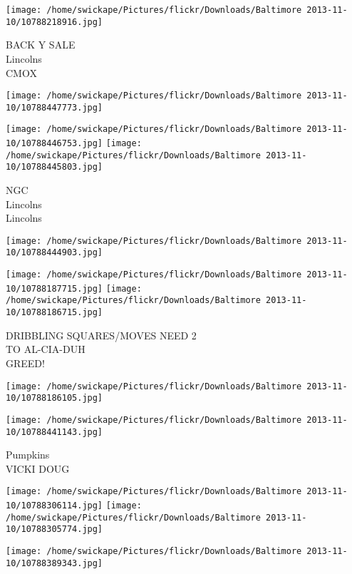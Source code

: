 \documentclass[10pt,letterpaper]{article}
\begin{document}
\texttt{[image: /home/swickape/Pictures/flickr/Downloads/Baltimore 2013-11-10/10788218916.jpg]}

BACK Y SALE\\
Lincolns\\
CMOX\\
\pagebreak

\texttt{[image: /home/swickape/Pictures/flickr/Downloads/Baltimore 2013-11-10/10788447773.jpg]}

\vspace{0.25in}
\texttt{[image: /home/swickape/Pictures/flickr/Downloads/Baltimore 2013-11-10/10788446753.jpg]}
\texttt{[image: /home/swickape/Pictures/flickr/Downloads/Baltimore 2013-11-10/10788445803.jpg]}

NGC\\
Lincolns\\
Lincolns\\
\pagebreak

\texttt{[image: /home/swickape/Pictures/flickr/Downloads/Baltimore 2013-11-10/10788444903.jpg]}

\vspace{0.25in}
\texttt{[image: /home/swickape/Pictures/flickr/Downloads/Baltimore 2013-11-10/10788187715.jpg]}
\texttt{[image: /home/swickape/Pictures/flickr/Downloads/Baltimore 2013-11-10/10788186715.jpg]}

DRIBBLING SQUARES/MOVES NEED 2\\
TO AL{-}CIA{-}DUH\\
GREED!\\
\pagebreak

\texttt{[image: /home/swickape/Pictures/flickr/Downloads/Baltimore 2013-11-10/10788186105.jpg]}

\vspace{0.25in}
\texttt{[image: /home/swickape/Pictures/flickr/Downloads/Baltimore 2013-11-10/10788441143.jpg]}

Pumpkins\\
VICKI DOUG\\
\pagebreak

\texttt{[image: /home/swickape/Pictures/flickr/Downloads/Baltimore 2013-11-10/10788306114.jpg]}
\texttt{[image: /home/swickape/Pictures/flickr/Downloads/Baltimore 2013-11-10/10788305774.jpg]}

\vspace{0.25in}
\texttt{[image: /home/swickape/Pictures/flickr/Downloads/Baltimore 2013-11-10/10788389343.jpg]}
\end{document}
